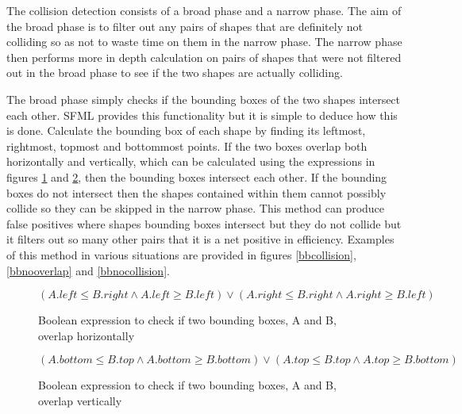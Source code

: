 \documentclass[]{report}
\begin{document}
			The collision detection consists of a broad phase and a narrow phase. The aim of the broad phase is to filter out any pairs of shapes that are definitely not colliding so as not to waste time on them in the narrow phase. The narrow phase then performs more in depth calculation on pairs of shapes that were not filtered out in the broad phase to see if the two shapes are actually colliding.
			
			The broad phase simply checks if the bounding boxes of the two shapes intersect each other. SFML provides this functionality but it is simple to deduce how this is done. Calculate the bounding box of each shape by finding its leftmost, rightmost, topmost and bottommost points. If the two boxes overlap both horizontally and vertically, which can be calculated using the expressions in figures \ref{horizontalbounding} and \ref{verticalbounding}, then the bounding boxes intersect each other. If the bounding boxes do not intersect then the shapes contained within them cannot possibly collide so they can be skipped in the narrow phase. This method can produce false positives where shapes bounding boxes intersect but they do not collide but it filters out so many other pairs that it is a net positive in efficiency. Examples of this method in various situations are provided in figures \ref{bbcollision}, \ref{bbnooverlap} and \ref{bbnocollision}.
			
			\begin{figure}[H]
				\centering
				
				\begin{displaymath}
					(A.left \leq B.right \land A.left \geq B.left) \lor (A.right \leq B.right \land A.right \geq B.left)
				\end{displaymath}
				
				\caption{Boolean expression to check if two bounding boxes, A and B, overlap horizontally}
				\label{horizontalbounding}
			\end{figure}
			
			\begin{figure}[H]
				\centering
				
				\begin{displaymath}
				(A.bottom \leq B.top \land A.bottom \geq B.bottom) \lor (A.top \leq B.top \land A.top \geq B.bottom)
				\end{displaymath}
				
				\caption{Boolean expression to check if two bounding boxes, A and B, overlap vertically}
				\label{verticalbounding}
			\end{figure}
			
\end{document}
